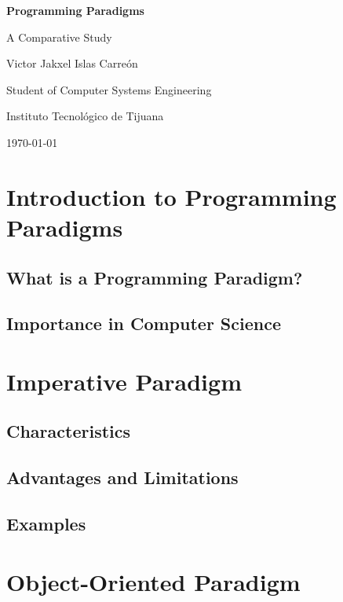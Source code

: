 \documentclass[11pt]{article}
\begin{document}
\begin{titlepage}
    \centering
    
    \vspace*{2cm}
    
    {\Huge\bfseries Programming Paradigms \par}
    
    \vspace{1cm}
    {\Large A Comparative Study \par}
    
    \vfill
    
    {\Large Victor Jakxel Islas Carreón \par}
    {\large Student of Computer Systems Engineering \par}
    {\large Instituto Tecnológico de Tijuana \par}
    \vfill
    {\large \today \par}
\end{titlepage}
\newpage
\tableofcontents
\newpage
\section{Introduction to Programming Paradigms}
\subsection{What is a Programming Paradigm?}
\subsection{Importance in Computer Science}

\section{Imperative Paradigm}
\subsection{Characteristics}
\subsection{Advantages and Limitations}
\subsection{Examples}

\section{Object-Oriented Paradigm}
\end{document}
